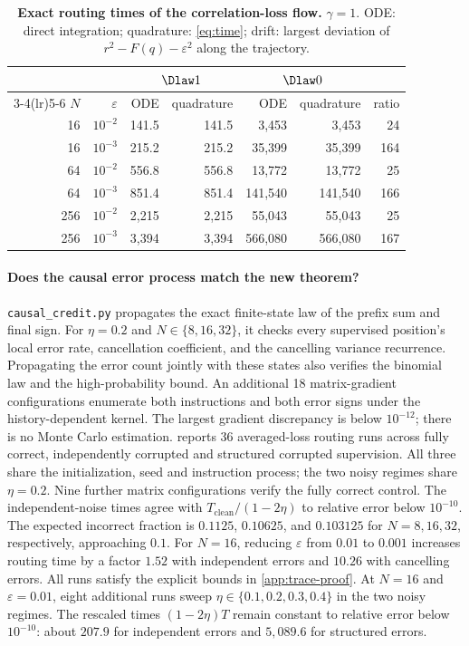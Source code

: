 \begin{table}[t]
\caption{\textbf{Exact routing times of the correlation-loss flow.} $\gamma=1$. ODE: direct integration; quadrature: \cref{eq:time}; drift:
largest deviation of $r^2-F(q)-\varepsilon^2$ along the trajectory.}
\label{tab:quadrature}
\centering\small
\begin{tabular}{@{}rr rr rr r@{}}
\toprule
 & & \multicolumn{2}{c}{$\Dlaw1$} & \multicolumn{2}{c}{$\Dlaw0$} & \\
\cmidrule(lr){3-4}\cmidrule(lr){5-6}
$N$ & $\varepsilon$ & ODE & quadrature & ODE & quadrature & ratio\\
\midrule
16  & $10^{-2}$ & 141.5  & 141.5  & 3{,}453   & 3{,}453   & 24\\
16  & $10^{-3}$ & 215.2  & 215.2  & 35{,}399  & 35{,}399  & 164\\
64  & $10^{-2}$ & 556.8  & 556.8  & 13{,}772  & 13{,}772  & 25\\
64  & $10^{-3}$ & 851.4  & 851.4  & 141{,}540 & 141{,}540 & 166\\
256 & $10^{-2}$ & 2{,}215 & 2{,}215 & 55{,}043  & 55{,}043  & 25\\
256 & $10^{-3}$ & 3{,}394 & 3{,}394 & 566{,}080 & 566{,}080 & 167\\
\bottomrule
\end{tabular}
\end{table}

\paragraph{Does the causal error process match the new theorem?}
\texttt{causal\_credit.py} propagates the exact finite-state law of the prefix sum and final sign.
For $\eta=0.2$ and $N\in\{8,16,32\}$, it checks every supervised position's local error rate, cancellation coefficient, and the cancelling variance recurrence.
Propagating the error count jointly with these states also verifies the binomial law and the high-probability bound.
An additional 18 matrix-gradient configurations enumerate both instructions and both error signs under the history-dependent kernel.
The largest gradient discrepancy is below $10^{-12}$; there is no Monte Carlo estimation.
 reports 36 averaged-loss routing runs across fully correct, independently corrupted and structured corrupted supervision.
All three share the initialization, seed and instruction process; the two noisy regimes share $\eta=0.2$.
Nine further matrix configurations verify the fully correct control.
The independent-noise times agree with $T_{\mathrm{clean}}/(1-2\eta)$ to relative error below $10^{-10}$.
The expected incorrect fraction is $0.1125$, $0.10625$, and $0.103125$ for $N=8,16,32$, respectively, approaching $0.1$.
For $N=16$, reducing $\varepsilon$ from $0.01$ to $0.001$ increases routing time by a factor $1.52$ with independent errors and $10.26$ with cancelling errors.
All runs satisfy the explicit bounds in \cref{app:trace-proof}.
At $N=16$ and $\varepsilon=0.01$, eight additional runs sweep $\eta\in\{0.1,0.2,0.3,0.4\}$ in the two noisy regimes.
The rescaled times $(1-2\eta)T$ remain constant to relative error below $10^{-10}$: about $207.9$ for independent errors and $5{,}089.6$ for structured errors.

